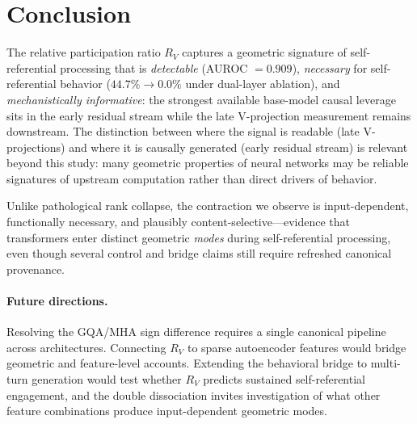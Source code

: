 \documentclass{article}
\newcommand{\RV}{R_V}
\begin{document}
\section{Conclusion}

The relative participation ratio $\RV$ captures a geometric signature of self-referential
processing that is \emph{detectable} (AUROC $= 0.909$),
\emph{necessary} for self-referential behavior ($44.7\% \to 0.0\%$ under dual-layer ablation),
and \emph{mechanistically informative}: the strongest available base-model causal leverage sits in
the early residual stream while the late V-projection measurement remains downstream.
The distinction between where the signal is readable (late V-projections) and where it is
causally generated (early residual stream) is relevant beyond this study: many geometric
properties of neural networks may be reliable signatures of upstream computation rather than
direct drivers of behavior.

Unlike pathological rank collapse, the contraction we observe is input-dependent, functionally
necessary, and plausibly content-selective---evidence that transformers enter distinct geometric
\emph{modes} during self-referential processing, even though several control and bridge claims
still require refreshed canonical provenance.

\paragraph{Future directions.}
Resolving the GQA/MHA sign difference requires a single canonical pipeline across architectures.
Connecting $\RV$ to sparse autoencoder features would bridge geometric and feature-level
accounts.
Extending the behavioral bridge to multi-turn generation would test whether $\RV$ predicts
sustained self-referential engagement, and the double dissociation invites investigation of
what other feature combinations produce input-dependent geometric modes.






\appendix
\end{document}
